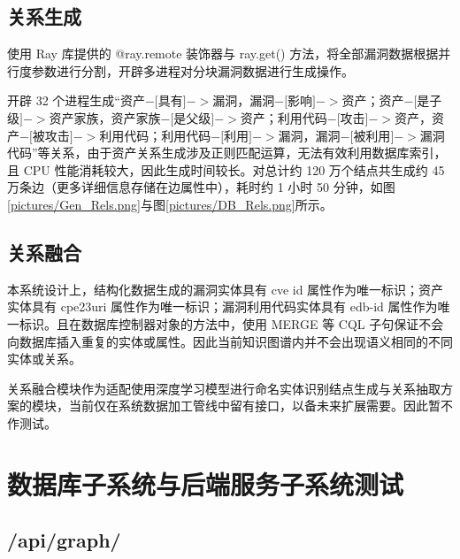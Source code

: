 \documentclass[a4paper,AutoFakeBold,oneside,12pt]{book}
\begin{document}


\subsection{关系生成}

使用 Ray 库提供的 @ray.remote 装饰器与 ray.get() 方法，将全部漏洞数据根据并行度参数进行分割，开辟多进程对分块漏洞数据进行生成操作。

开辟 32 个进程生成“资产$-[$具有$]->$漏洞，漏洞$-[$影响$]->$资产；资产$-[$是子级$]->$资产家族，资产家族$-[$是父级$]->$资产；利用代码$-[$攻击$]->$资产，资产$-[$被攻击$]->$利用代码；利用代码$-[$利用$]->$漏洞，漏洞$-[$被利用$]->$漏洞代码”等关系，由于资产关系生成涉及正则匹配运算，无法有效利用数据库索引，且 CPU 性能消耗较大，因此生成时间较长。对总计约 120 万个结点共生成约 45 万条边（更多详细信息存储在边属性中），耗时约 1 小时 50 分钟，如图\ref{pictures/Gen_Rels.png}与图\ref{pictures/DB_Rels.png}所示。



\subsection{关系融合}

本系统设计上，结构化数据生成的漏洞实体具有 cve id 属性作为唯一标识；资产实体具有 cpe23uri 属性作为唯一标识；漏洞利用代码实体具有 edb-id 属性作为唯一标识。且在数据库控制器对象的方法中，使用 MERGE 等 CQL 子句保证不会向数据库插入重复的实体或属性。因此当前知识图谱内并不会出现语义相同的不同实体或关系。

关系融合模块作为适配使用深度学习模型进行命名实体识别结点生成与关系抽取方案的模块，当前仅在系统数据加工管线中留有接口，以备未来扩展需要。因此暂不作测试。

\section{数据库子系统与后端服务子系统测试}

\subsection{/api/graph/}
\end{document}
